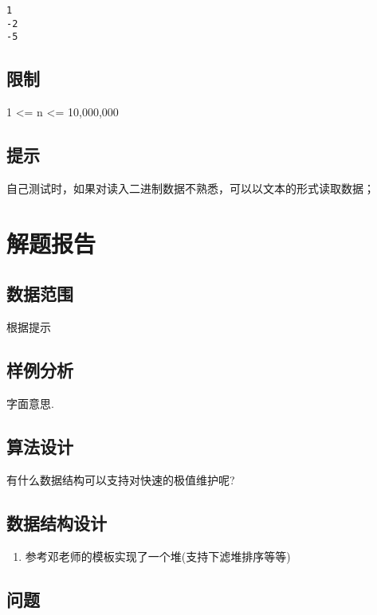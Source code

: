 \documentclass[12pt,a4paper]{ctexart}
\def\tightlist{}
\begin{document}
\begin{verbatim}
1
-2
-5
\end{verbatim}

\subsection{限制}\label{ux9650ux5236}

1 \textless{}= n \textless{}= 10,000,000

\subsection{提示}\label{ux63d0ux793a}

自己测试时，如果对读入二进制数据不熟悉，可以以文本的形式读取数据；

\section{解题报告}\label{ux89e3ux9898ux62a5ux544a}

\subsection{数据范围}\label{ux6570ux636eux8303ux56f4}

根据提示

\subsection{样例分析}\label{ux6837ux4f8bux5206ux6790}

字面意思.

\subsection{算法设计}\label{ux7b97ux6cd5ux8bbeux8ba1}

有什么数据结构可以支持对快速的极值维护呢?

\subsection{数据结构设计}\label{ux6570ux636eux7ed3ux6784ux8bbeux8ba1}

\begin{enumerate}
\def\labelenumi{\arabic{enumi}.}
\tightlist
\item
  参考邓老师的模板实现了一个堆(支持下滤堆排序等等)
\end{enumerate}

\subsection{问题}\label{ux95eeux9898}
\end{document}

